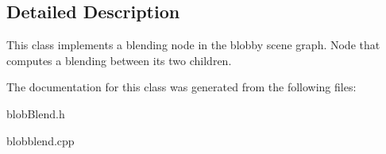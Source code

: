 \subsection{Detailed Description}
This class implements a blending node in the blobby scene graph. Node that computes a blending between its two children. 

The documentation for this class was generated from the following files:\begin{DoxyCompactItemize}
\item 
blobBlend.h\item 
blobblend.cpp\end{DoxyCompactItemize}
